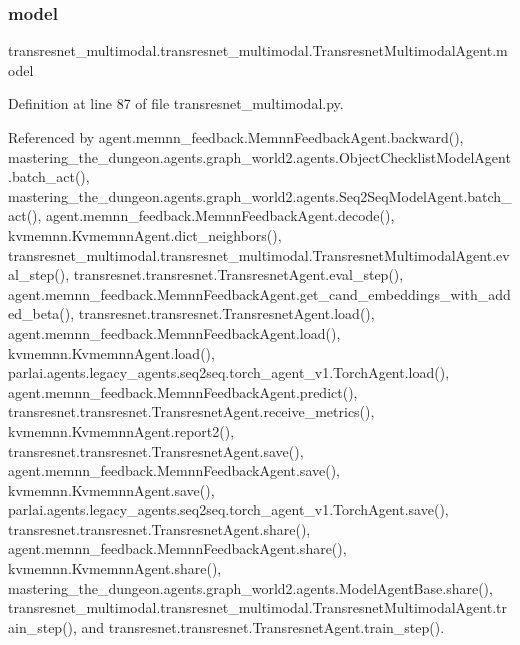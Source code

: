 \mbox{\label{classtransresnet__multimodal_1_1transresnet__multimodal_1_1TransresnetMultimodalAgent_a8423e370ab64b18f9ff32f009e8c6c35}} 
\subsubsection{\texorpdfstring{model}{model}}
{\footnotesize\ttfamily transresnet\+\_\+multimodal.\+transresnet\+\_\+multimodal.\+Transresnet\+Multimodal\+Agent.\+model}



Definition at line 87 of file transresnet\+\_\+multimodal.\+py.



Referenced by agent.\+memnn\+\_\+feedback.\+Memnn\+Feedback\+Agent.\+backward(), mastering\+\_\+the\+\_\+dungeon.\+agents.\+graph\+\_\+world2.\+agents.\+Object\+Checklist\+Model\+Agent.\+batch\+\_\+act(), mastering\+\_\+the\+\_\+dungeon.\+agents.\+graph\+\_\+world2.\+agents.\+Seq2\+Seq\+Model\+Agent.\+batch\+\_\+act(), agent.\+memnn\+\_\+feedback.\+Memnn\+Feedback\+Agent.\+decode(), kvmemnn.\+Kvmemnn\+Agent.\+dict\+\_\+neighbors(), transresnet\+\_\+multimodal.\+transresnet\+\_\+multimodal.\+Transresnet\+Multimodal\+Agent.\+eval\+\_\+step(), transresnet.\+transresnet.\+Transresnet\+Agent.\+eval\+\_\+step(), agent.\+memnn\+\_\+feedback.\+Memnn\+Feedback\+Agent.\+get\+\_\+cand\+\_\+embeddings\+\_\+with\+\_\+added\+\_\+beta(), transresnet.\+transresnet.\+Transresnet\+Agent.\+load(), agent.\+memnn\+\_\+feedback.\+Memnn\+Feedback\+Agent.\+load(), kvmemnn.\+Kvmemnn\+Agent.\+load(), parlai.\+agents.\+legacy\+\_\+agents.\+seq2seq.\+torch\+\_\+agent\+\_\+v1.\+Torch\+Agent.\+load(), agent.\+memnn\+\_\+feedback.\+Memnn\+Feedback\+Agent.\+predict(), transresnet.\+transresnet.\+Transresnet\+Agent.\+receive\+\_\+metrics(), kvmemnn.\+Kvmemnn\+Agent.\+report2(), transresnet.\+transresnet.\+Transresnet\+Agent.\+save(), agent.\+memnn\+\_\+feedback.\+Memnn\+Feedback\+Agent.\+save(), kvmemnn.\+Kvmemnn\+Agent.\+save(), parlai.\+agents.\+legacy\+\_\+agents.\+seq2seq.\+torch\+\_\+agent\+\_\+v1.\+Torch\+Agent.\+save(), transresnet.\+transresnet.\+Transresnet\+Agent.\+share(), agent.\+memnn\+\_\+feedback.\+Memnn\+Feedback\+Agent.\+share(), kvmemnn.\+Kvmemnn\+Agent.\+share(), mastering\+\_\+the\+\_\+dungeon.\+agents.\+graph\+\_\+world2.\+agents.\+Model\+Agent\+Base.\+share(), transresnet\+\_\+multimodal.\+transresnet\+\_\+multimodal.\+Transresnet\+Multimodal\+Agent.\+train\+\_\+step(), and transresnet.\+transresnet.\+Transresnet\+Agent.\+train\+\_\+step().

